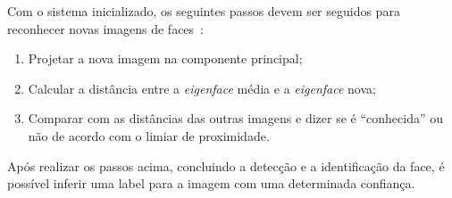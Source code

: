 	Com o sistema inicializado, os seguintes passos devem ser seguidos para
	reconhecer novas imagens de faces~\cite{turk}:
	
	\begin{enumerate}
		\item Projetar a nova imagem na componente principal;
		\item Calcular a distância entre a \textit{eigenface} média e a \textit{eigenface} nova;
		\item Comparar com as distâncias das outras imagens e dizer se é ``conhecida'' ou não de acordo com o limiar de proximidade.
	\end{enumerate}
	
	Após realizar os passos acima, concluindo a detecção e a identificação da face,
	é possível inferir uma label para a imagem com uma determinada confiança.
